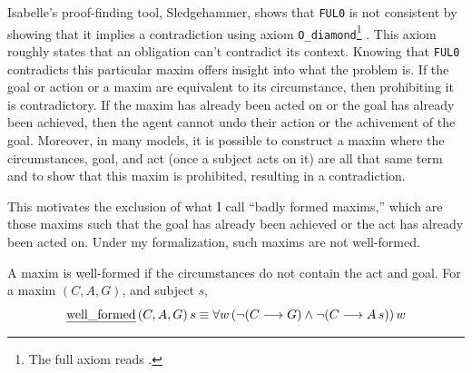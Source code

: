 \begin{isabellebody}
%
\endisadelimproof
%
\begin{isamarkuptext}%
Isabelle's proof-finding tool, Sledgehammer, shows that 
\texttt{FUL0} is not consistent by showing that it implies a contradiction 
using axiom \texttt{O\_diamond}\footnote{The full axiom reads .} \citep{sledgehammer}. 
This axiom roughly states that an obligation can't contradict its context. Knowing that \texttt{FUL0}
contradicts this particular maxim offers insight into what the problem is. If the goal or action
or a maxim are equivalent to its circumstance, then prohibiting it is contradictory. If the maxim has already been 
acted on or the goal has already been achieved, then the agent cannot undo their action or the achivement 
of the goal. Moreover, in many models, it is possible to construct a maxim where the circumstances, goal, 
and act (once a subject acts on it) are all that same term and to show that this maxim is prohibited,
resulting in a contradiction. 

This motivates the exclusion of what I call ``badly formed maxims,'' which are those maxims such that 
the goal has already been achieved or the act has already been acted on. Under my formalization, such maxims are
not well-formed. 

\begin{definition}
A maxim is well-formed if the circumstances do not contain the act and goal. For a maxim $(C, A, G)$, and subject $s$, 
$$ \text{\emph{well\_formed}} \, (C, A, G) \, s \equiv \forall w \, (\neg (C \longrightarrow G) \wedge \neg (C \longrightarrow A \, s)) \, w$$

\end{definition}


\end{isamarkuptext}
\end{isabellebody}
